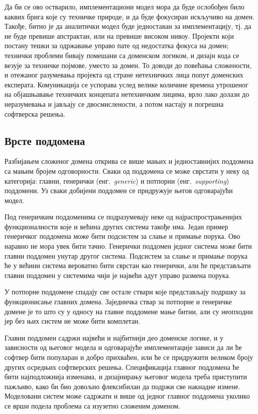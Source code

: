 \documentclass[12pt,oneside]{memoir}
\begin{document}
Да би се ово остварило, имплементациони модел мора да буде ослобођен било каквих брига које су техничке природе, и да буде фокусиран искључиво на домен. Такође, битно је да аналитички модел буде једноставан за имплементацију, тј. да не буде превише апстрактан, или на превише високом нивоу. Пројекти који постану тешки за одржавање управо пате од недостатка фокуса на домен; технички проблеми бивају помешани са доменском логиком, и дизајн кода се везује за техничке појмове, уместо за домен. То доводи до повећања сложености, и отежаног разумевања пројекта од стране нетехничких лица попут доменских експерата. Комуникација се успорава услед велике количине времена утрошеног на објашњавање техничких концепата нетехничким лицима, врло лако долази до неразумевања и јављају се двосмислености, а потом настају и погрешна софтверска решења.

\subsection{Врсте поддомена}
Разбијањем сложеног домена открива се више мањих и једноставнијих поддомена са мањим бројем одговорности. Сваки од поддомена се може сврстати у неку од категорија: главни, генерички (енг.~\textit{generic}) и потпорни (енг.~\textit{supporting}) поддомени. Уз сваки добијени поддомен се придружује његов одговарајући модел.

Под генеричким поддоменима се подразумевају неке од најраспрострањенијих функционалности које и већина других система такође има. Један пример генеричког поддомена може бити подсистем за слање и примање порука. Ово наравно не мора увек бити тачно. Генерички поддомен једног система може бити главни поддомен унутар другог система. Подсистем за слање и примање порука ће у већини система вероватно бити сврстан као генерички, али ће представљати главни поддомен у системима чији је највећи адут управо размена порука.

У потпорне поддомене спадају све остале ствари које представљају подршку за функционисање главних домена. Заједничка ствар за потпорне и генеричке домене је то што су у односу на главне поддомене мање битни, али су неопходни јер без њих систем не може бити комплетан.

Главни поддомен садржи највећи и најбитнији део доменске логике, и у зависности од његовог модела и одговарајуће имплементације зависи да ли ће софтвер бити популаран и добро прихваћен, или ће се придружити великом броју других осредњих софтверских решења. Спецификација главног поддомена ће бити најподложнија изменама, и дизајнирању његовог модела треба приступити пажљиво, како би био довољно флексибилан да подржи све накнадне измене. Моделовани систем може садржати и више од једног главног поддомена уколико се врши подела проблема са изузетно сложеним доменом.
\end{document}
